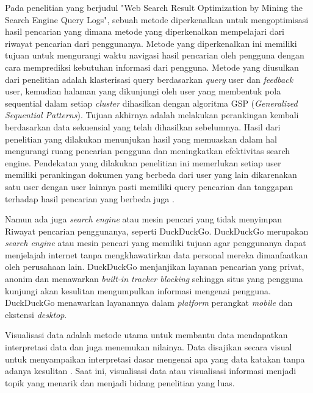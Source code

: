 Pada penelitian yang berjudul "Web Search Result Optimization by Mining the Search Engine Query Logs", sebuah metode diperkenalkan untuk mengoptimisasi hasil pencarian yang dimana metode yang diperkenalkan mempelajari dari riwayat pencarian dari penggunanya. Metode yang diperkenalkan ini memiliki tujuan untuk mengurangi waktu navigasi hasil pencarian oleh pengguna dengan cara memprediksi kebutuhan informasi dari pengguna. Metode yang diusulkan dari penelitian adalah klasterisasi query berdasarkan \textit{query} user dan \textit{feedback} user, kemudian halaman yang dikunjungi oleh user yang membentuk pola sequential dalam setiap \textit{cluster} dihasilkan dengan algoritma GSP (\textit{Generalized Sequential Patterns}). Tujuan akhirnya adalah melakukan perankingan kembali berdasarkan data sekuensial yang telah dihasilkan sebelumnya. Hasil dari penelitian yang dilakukan menunjukan hasil yang memuaskan dalam hal mengurangi ruang pencarian pengguna dan meningkatkan efektivitas search engine. Pendekatan yang dilakukan penelitian ini memerlukan setiap user memiliki perankingan dokumen yang berbeda dari user yang lain dikarenakan satu user dengan user lainnya pasti memiliki query pencarian dan tanggapan terhadap hasil pencarian yang berbeda juga \citep{improvingsearchresultbyminingusersquerylogs}.

Namun ada juga \textit{search engine} atau mesin pencari yang tidak menyimpan Riwayat pencarian penggunanya, seperti DuckDuckGo. DuckDuckGo merupakan \textit{search engine} atau mesin pencari yang memiliki tujuan agar penggunanya dapat menjelajah internet tanpa mengkhawatirkan data personal mereka dimanfaatkan oleh perusahaan lain. DuckDuckGo menjanjikan layanan pencarian yang privat, anonim dan menawarkan \textit{built-in tracker blocking} sehingga situs yang pengguna kunjungi akan kesulitan mengumpulkan informasi mengenai pengguna. DuckDuckGo menawarkan layanannya dalam \textit{platform} perangkat \textit{mobile} dan ekstensi \textit{desktop}. 

Visualisasi data adalah metode utama untuk membantu data mendapatkan interpretasi data dan juga menemukan nilainya. Data disajikan secara visual untuk menyampaikan interpretasi dasar mengenai apa yang data katakan tanpa adanya kesulitan \citep{datavisualizationbalogun}. Saat ini, visualisasi data atau visualisasi informasi menjadi topik yang menarik dan menjadi bidang penelitian yang luas. \citep{dbpediacasestudy} 

\iffalse
Graph adalah struktur matematika yang terdiri dari titik dan sisi yang menggambarkan hubungan antara beberapa entitas yang dimana titik memrepresentasikan entitas dan sisi yang ada di antara dua titik melambangkan bahwa dua entitas yang terhubung.\textit{Graph} dirumuskan dengan G=(V,E) yang terdiri dari beberapa titik \textit{vertices} (V) dan beberapa sisi \textit{edges} (pasangan titik). Banyak node dilambangkan dengan n = |V| dan banyaknya sisi dilambankgan dengan m = |E|. Apabila ada sisi yang menghubungkan antara titik i dengan titik j, dapat dilambangkan dengan notasi i -> j, jika graph tersebut tidak berarah maka dapat dilambangkan dengan notasi i <-> j (i dan j titik yang bertetangga). \citep{graphyifanhu}
\fi

